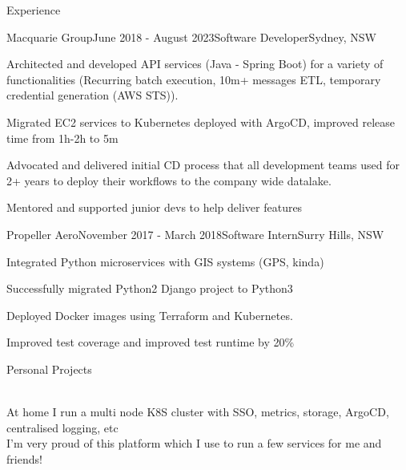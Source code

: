 \documentclass{resume} %
\begin{document}

\begin{rSection}{Experience}
    \begin{rSubsection}{Macquarie Group}{June 2018 - August 2023}{Software Developer}{Sydney, NSW}
    \item Architected and developed API services (Java - Spring Boot) for a variety of functionalities (Recurring batch execution, 10m+ messages ETL, temporary credential generation (AWS STS)).
    \item Migrated EC2 services to Kubernetes deployed with ArgoCD, improved release time from 1h-2h to 5m~
    \item Advocated and delivered initial CD process that all development teams used for 2+ years to deploy their workflows to the company wide datalake.
    \item Mentored and supported junior devs to help deliver features
    \end{rSubsection}

    \begin{rSubsection}{Propeller Aero}{November 2017 - March 2018}{Software Intern}{Surry Hills, NSW}
    \item Integrated Python microservices with GIS systems (GPS, kinda)
    \item Successfully migrated Python2 Django project to Python3
    \item Deployed Docker images using Terraform and Kubernetes.
    \item Improved test coverage and improved test runtime by 20\%
    \end{rSubsection}
    
    \end{rSection}


    \begin{rSection}{Personal Projects}

        \href{https://github.com/Tyler-Cash/homelab}{\color{blue}{\bf Homelab (10 stars)}} \hfill \\
        At home I run a multi node K8S cluster with SSO, metrics, storage, ArgoCD, centralised logging, etc\\
        I'm very proud of this platform which I use to run a few services for me and friends!\\
        \end{rSection}
\end{document}
